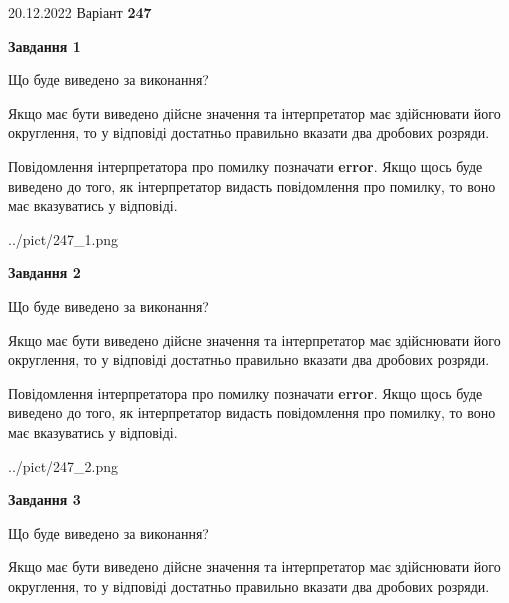\documentclass[12pt, ukrainian]{article}
\begin{document}
{20.12.2022 Варіант \No \textbf { 247 }\par}
{
\begin {Large}

{\begin {center}\textbf{Завдання 1}\end {center}}\par
Що буде виведено за виконання? \par

Якщо має бути виведено дійсне значення та інтерпретатор має здійснювати його округлення, 
то у відповіді достатньо правильно вказати два дробових розряди.

Повідомлення інтерпретатора про помилку позначати \textbf{error}.
Якщо щось буде виведено до того, як інтерпретатор видасть повідомлення про помилку, 
то воно має вказуватись у відповіді. \par

\begin{center}
	{../pict/247_1.png}
\end{center}
\newpage

{\begin {center}\textbf{Завдання 2}\end {center}}\par
Що буде виведено за виконання? \par

Якщо має бути виведено дійсне значення та інтерпретатор має здійснювати його округлення, 
то у відповіді достатньо правильно вказати два дробових розряди.

Повідомлення інтерпретатора про помилку позначати \textbf{error}.
Якщо щось буде виведено до того, як інтерпретатор видасть повідомлення про помилку, 
то воно має вказуватись у відповіді. \par

\begin{center}
	{../pict/247_2.png}
\end{center}
\newpage

{\begin {center}\textbf{Завдання 3}\end {center}}\par
Що буде виведено за виконання? \par

Якщо має бути виведено дійсне значення та інтерпретатор має здійснювати його округлення, 
то у відповіді достатньо правильно вказати два дробових розряди.


\end{Large}}
\end{document}
